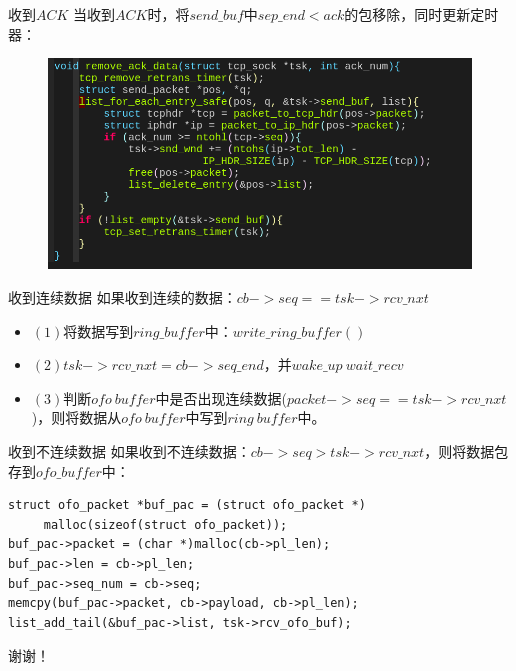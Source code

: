\documentclass{beamer}
\begin{document}
\begin{frame}{收到$ACK$}
  当收到$ACK$时，将$send\_buf$中$sep\_end <ack$的包移除，同时更新定时器：
  \begin{figure}[H]
	\centering
	\includegraphics[scale = 0.35]{./fig/rmv_ack.png}
  \end{figure}
\end{frame}

\begin{frame}{收到连续数据}
  如果收到连续的数据：$cb->seq  = = tsk->rcv\_nxt$
  \begin{itemize}
	\item $(1)$将数据写到$ring\_buffer$中：$write\_ring\_buffer()$
	\item $(2) tsk->rcv\_nxt = cb->seq\_end$，并$wake\_up\ wait\_recv$
	\item $(3)$判断$ofo\ buffer$中是否出现连续数据($packet->seq = = tsk->rcv\_nxt$)，则将数据从$ofo\ buffer$中写到$ring\ buffer$中。
  \end{itemize}
\end{frame}

\begin{frame}[fragile]{收到不连续数据}
  如果收到不连续数据：$cb->seq > tsk->rcv\_nxt$，则将数据包存到$ofo\_buffer$中：
\begin{lstlisting}
struct ofo_packet *buf_pac = (struct ofo_packet *)
     malloc(sizeof(struct ofo_packet));
buf_pac->packet = (char *)malloc(cb->pl_len);
buf_pac->len = cb->pl_len;
buf_pac->seq_num = cb->seq;
memcpy(buf_pac->packet, cb->payload, cb->pl_len);
list_add_tail(&buf_pac->list, tsk->rcv_ofo_buf);
\end{lstlisting}
\end{frame}

\begin{frame}
  \begin{center}
	谢谢！
\end{center}
\end{frame}
\end{document}
